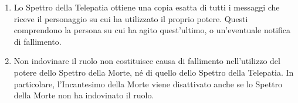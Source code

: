 \documentclass[a4paper,10pt]{article}
\begin{document}
\begin{enumerate}

	\item Lo Spettro della Telepatia ottiene una copia esatta di tutti i messaggi che riceve il personaggio su cui ha utilizzato il proprio potere. Questi comprendono la persona su cui ha agito quest'ultimo, o un'eventuale notifica di fallimento.

	\item Non indovinare il ruolo non costituisce causa di fallimento nell'utilizzo del potere dello Spettro della Morte, né di quello dello Spettro della Telepatia. In particolare, l'Incantesimo della Morte viene disattivato anche se lo Spettro della Morte non ha indovinato il ruolo.


\end{enumerate}
\end{document}
